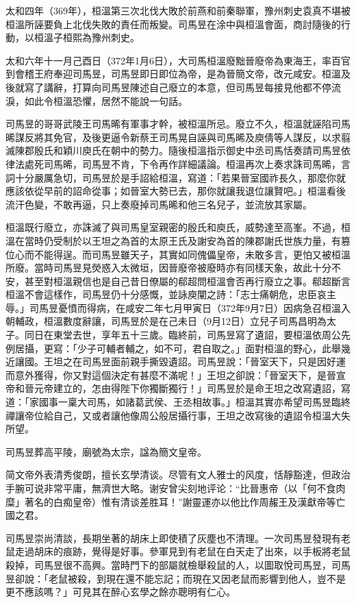 太和四年（369年），桓溫第三次北伐大敗於前燕和前秦聯軍，豫州刺史袁真不堪被桓溫所誣要負上北伐失敗的責任而叛變。司馬昱在涂中與桓溫會面，商討隨後的行動，以桓溫子桓熙為豫州刺史。

太和六年十一月己酉日（372年1月6日），大司馬桓溫廢黜晉廢帝為東海王，率百官到會稽王府奉迎司馬昱，司馬昱即日即位為帝，是為晉簡文帝，改元咸安。桓溫及後就寫了講辭，打算向司馬昱陳述自己廢立的本意，但司馬昱每接見他都不停流淚，如此令桓溫恐懼，居然不能說一句話。

司馬昱的哥哥武陵王司馬晞有軍事才幹，被桓溫所忌。廢立不久，桓溫就誣陷司馬晞謀反將其免官，及後更逼令新蔡王司馬晃自誣與司馬晞及庾倩等人謀反，以求翦滅陳郡殷氏和穎川庾氏在朝中的勢力。隨後桓溫指示御史中丞司馬恬奏請司馬昱依律法處死司馬晞，司馬昱不肯，下令再作詳細議論。桓溫再次上奏求誅司馬晞，言詞十分嚴厲急切，司馬昱於是手詔給桓溫，寫道：「若果晉室國祚長久，那麼你就應該依從早前的詔命從事；如晉室大勢已去，那你就讓我退位讓賢吧。」桓溫看後流汗色變，不敢再逼，只上奏廢掉司馬晞和他三名兒子，並流放其家屬。

桓溫既行廢立，亦誅滅了與司馬皇室親密的殷氏和庾氏，威勢達至高峯。不過，桓溫在當時仍受制於以王坦之為首的太原王氏及謝安為首的陳郡謝氏世族力量，有篡位心而不能得逞。而司馬昱雖天子，其實如同傀儡皇帝，未敢多言，更怕又被桓溫所廢。當時司馬昱見熒惑入太微垣，因晉廢帝被廢時亦有同樣天象，故此十分不安，甚至對桓溫親信也是自己昔日僚屬的郗超問桓溫會否再行廢立之事。郗超斷言桓溫不會這樣作，司馬昱仍十分感慨，並詠庾闡之詩：「志士痛朝危，忠臣哀主辱。」司馬昱憂憤而得病，在咸安二年七月甲寅日（372年9月7日）因病急召桓溫入朝輔政，桓溫數度辭讓，司馬昱於是在己未日（9月12日）立兒子司馬昌明為太子。同日在東堂去世，享年五十三歲。臨終前，司馬昱寫了遺詔，要桓溫依周公先例居攝，更寫：「少子可輔者輔之，如不可，君自取之。」面對桓溫的野心，此舉幾近讓國。王坦之在司馬昱面前親手撕毀遺詔。司馬昱說：「晉室天下，只是因好運而意外獲得，你又對這個決定有甚麼不滿呢！」王坦之卻說：「晉室天下，是晉宣帝和晉元帝建立的，怎由得陛下你獨斷獨行！」司馬昱於是命王坦之改寫遺詔，寫道：「家國事一稟大司馬，如諸葛武侯、王丞相故事。」桓溫其實亦希望司馬昱臨終禪讓帝位給自己，又或者讓他像周公般居攝行事，王坦之改寫後的遺詔令桓溫大失所望。

司馬昱葬高平陵，廟號為太宗，諡為簡文皇帝。

简文帝外表清秀俊朗，擅长玄學清谈。尽管有文人雅士的风度，恬靜豁達，但政治手腕可说非常平庸，無濟世大略。谢安曾尖刻地评论：“比晉惠帝（以「何不食肉糜」著名的白痴皇帝）惟有清谈差胜耳！”謝靈運亦以他比作周赧王及漢獻帝等亡國之君。

司馬昱崇尚清談，長期坐著的胡床上即使積了灰塵也不清理。一次司馬昱發現有老鼠走過胡床的痕跡，覺得是好事。參軍見到有老鼠在白天走了出來，以手板將老鼠殺掉，司馬昱很不高興。當時門下的部屬就檢舉殺鼠的人，以圖取悅司馬昱，司馬昱卻說：「老鼠被殺，到現在還不能忘記；而現在又因老鼠而影響到他人，豈不是更不應該嗎？」可見其在醉心玄學之餘亦聰明有仁心。

